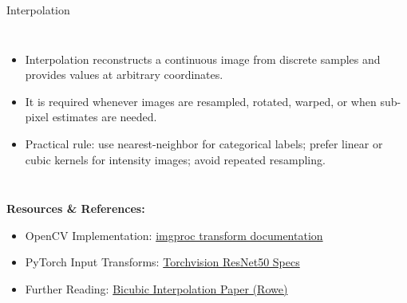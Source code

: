 \documentclass[aspectratio=169,10pt]{beamer}
\begin{document}
\begin{frame}{Interpolation}
\begin{columns}[T,onlytextwidth]
\begin{itemize}
  \item Interpolation reconstructs a continuous image from discrete samples and provides values at arbitrary coordinates.
  \item It is required whenever images are resampled, rotated, warped, or when sub-pixel estimates are needed.
  \item Practical rule: use nearest-neighbor for categorical labels; prefer linear or cubic kernels for intensity images; avoid repeated resampling.
\end{itemize}

\centering
{}
\end{columns}

\vspace{1em}
\textbf{Resources \& References:}
\begin{itemize}
  \item OpenCV Implementation: \href{https://docs.opencv.org/3.4/da/d54/group__imgproc__transform.html\#ga5bb5a1fea74ea38e1a5445ca803ff121}{\color{blue}imgproc transform documentation}
  \item PyTorch Input Transforms: \href{https://pytorch.org/vision/stable/models/generated/torchvision.models.resnet50.html\#torchvision.models.resnet50}{\color{blue}Torchvision ResNet50 Specs}
  \item Further Reading: \href{https://www.mssc.mu.edu/~daniel/pubs/RoweTalkMSCS_BiCubic.pdf}{\color{blue}Bicubic Interpolation Paper (Rowe)}
\end{itemize}


\end{frame}
\end{document}
